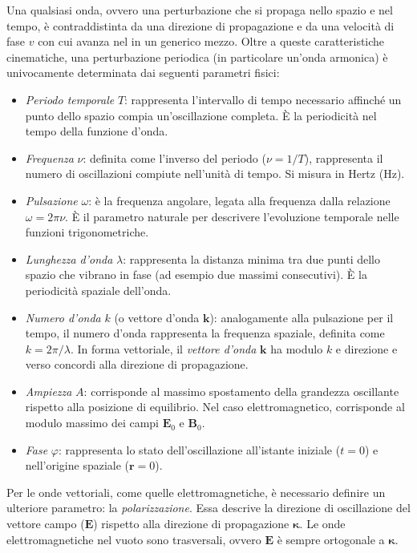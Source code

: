\documentclass[a4paper,11pt]{report}
\begin{document}
\begin{approfondimento}[
    colback=white,
    colframe=blue!50!black, %
    boxed title style={
        colback=blue!50!black,
        sharp corners,
        frame hidden
    },
    title=Caratteristiche di un'onda]
Una qualsiasi onda, ovvero una perturbazione che si propaga nello spazio e nel tempo, è contraddistinta da una direzione di propagazione e da una velocità di fase $v$ con cui avanza nel in un generico mezzo. Oltre a queste caratteristiche cinematiche, una perturbazione periodica (in particolare un'onda armonica) è univocamente determinata dai seguenti parametri fisici:
\begin{itemize}
    \item \textit{Periodo temporale} $T$: rappresenta l'intervallo di tempo necessario affinché un punto dello spazio compia un'oscillazione completa. È la periodicità nel tempo della funzione d'onda.
    
    \item \textit{Frequenza} $\nu$: definita come l'inverso del periodo ($\nu = 1/T$), rappresenta il numero di oscillazioni compiute nell'unità di tempo. Si misura in Hertz ($\si{\hertz}$).
    
    \item \textit{Pulsazione} $\omega$: è la frequenza angolare, legata alla frequenza dalla relazione $\omega = 2\pi\nu$. È il parametro naturale per descrivere l'evoluzione temporale nelle funzioni trigonometriche.
    
    \item \textit{Lunghezza d'onda} $\lambda$: rappresenta la distanza minima tra due punti dello spazio che vibrano in fase (ad esempio due massimi consecutivi). È la periodicità spaziale dell'onda.
    
    \item \textit{Numero d'onda} $k$ (o vettore d'onda $\bm{k}$): analogamente alla pulsazione per il tempo, il numero d'onda rappresenta la frequenza spaziale, definita come $k = 2\pi/\lambda$.
    In forma vettoriale, il \textit{vettore d'onda} $\bm{k}$ ha modulo $k$ e direzione e verso concordi alla direzione di propagazione.
    
    \item \textit{Ampiezza} $A$: corrisponde al massimo spostamento della grandezza oscillante rispetto alla posizione di equilibrio. Nel caso elettromagnetico, corrisponde al modulo massimo dei campi $\bm{E}_0$ e $\bm{B}_0$.
    
    \item \textit{Fase} $\varphi$: rappresenta lo stato dell'oscillazione all'istante iniziale ($t=0$) e nell'origine spaziale ($\bm{r}=0$).
\end{itemize}
    Per le onde vettoriali, come quelle elettromagnetiche, è necessario definire un ulteriore parametro: la \textit{polarizzazione}. Essa descrive la direzione di oscillazione del vettore campo ($\bm{E}$) rispetto alla direzione di propagazione $\bm{\kappa}$. Le onde elettromagnetiche nel vuoto sono trasversali, ovvero $\bm{E}$ è sempre ortogonale a $\bm{\kappa}$.
\end{approfondimento}
\end{document}
